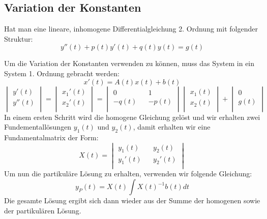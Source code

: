 \subsection{Variation der Konstanten}
Hat man eine lineare, inhomogene Differentialgleichung 2. Ordnung mit folgender Struktur:\\
\begin{equation*}
y''(t) + p(t)y'(t) + q(t)y(t) = g(t)
\end{equation*}

Um die Variation der Konstanten verwenden zu  können, muss das System in ein System 1. Ordnung gebracht werden:\\
\begin{equation*}
x'(t) = A(t)x(t) + b(t)
\end{equation*}
\begin{equation*}
	\begin{vmatrix} 
	        y'(t)\\ 
	        y''(t)\\   
	\end{vmatrix}
	=
	\begin{vmatrix} 
	        x_1'(t)\\ 
	        x_2'(t)\\   
	\end{vmatrix}
	=
	\begin{vmatrix} 
	        0 && 1\\ 
	       -q(t) && -p(t)\\   
	\end{vmatrix}
	\begin{vmatrix} 
	        x_1(t)\\ 
	        x_2(t)\\   
	\end{vmatrix}
	+
	\begin{vmatrix} 
	        0\\ 
	        g(t)\\   
	\end{vmatrix}
\end{equation*}
In einem ersten Schritt wird die homogene Gleichung gelöst und wir erhalten zwei Fundementallösungen $y_1(t)$ und $y_2(t)$, damit erhalten wir eine Fundamentalmatrix der Form: \\
\begin{equation*}
X(t) = 
	\begin{vmatrix} 
	        y_1(t) && y_2(t)\\ 
	        y_1'(t) && y_2'(t)\\ 
	\end{vmatrix}
\end{equation*}
Um nun die partikuläre Lösung zu erhalten, verwenden wir folgende Gleichung: 
\begin{equation*}
y_P(t) = X(t) \int{X(t)^{-1}b(t)dt}
\end{equation*}
Die gesamte Lösung ergibt sich dann wieder aus der Summe der homogenen sowie der partikulären Lösung. 
